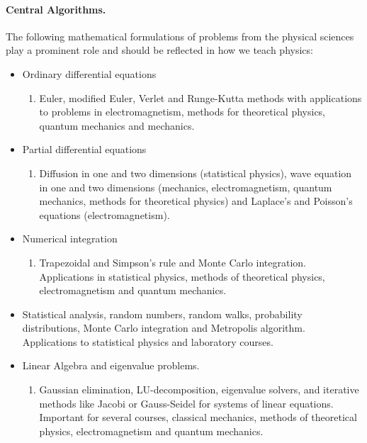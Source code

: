 \documentclass[graybox,envcountchap,sectrefs]{svmult}
\begin{document}
\paragraph{Central Algorithms.}
The following mathematical formulations of problems from the physical sciences play a prominent role and should be reflected in how we teach physics:
\begin{itemize}
\item Ordinary differential equations
\begin{enumerate}

  \item Euler, modified Euler, Verlet and Runge-Kutta methods with applications to problems in electromagnetism, methods for theoretical physics, quantum mechanics and mechanics.

\end{enumerate}

\noindent
\item Partial differential equations
\begin{enumerate}

  \item Diffusion in one and two dimensions (statistical physics), wave equation in one and two dimensions (mechanics, electromagnetism, quantum mechanics, methods for theoretical physics) and Laplace's and Poisson's equations (electromagnetism).

\end{enumerate}

\noindent
\item Numerical integration
\begin{enumerate}

  \item Trapezoidal and Simpson's rule and Monte Carlo integration. Applications in statistical physics, methods of theoretical physics, electromagnetism and quantum mechanics.

\end{enumerate}

\noindent
\item Statistical analysis, random numbers, random walks, probability distributions, Monte Carlo integration and Metropolis algorithm. Applications to statistical physics and laboratory courses.

\item Linear Algebra and eigenvalue problems.
\begin{enumerate}

  \item Gaussian elimination, LU-decomposition, eigenvalue solvers, and iterative methods like  Jacobi or Gauss-Seidel for systems of linear equations. Important for several courses, classical mechanics, methods of theoretical physics, electromagnetism and quantum mechanics.


\end{enumerate}
\end{itemize}
\end{document}
